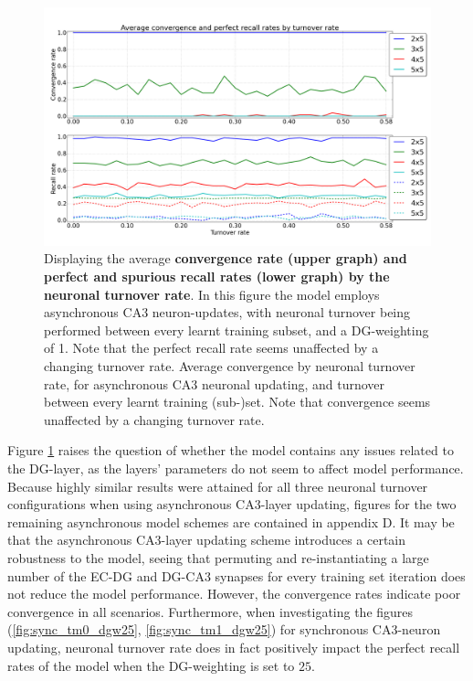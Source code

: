 \begin{figure}
    \centering
    \includegraphics[width=13cm]{fig/turnover_rates/async_tm0_dgw1}
    \caption{Displaying the average \textbf{convergence rate (upper graph) and perfect and spurious recall rates (lower graph) by the neuronal turnover rate}. In this figure the model employs asynchronous CA3 neuron-updates, with neuronal turnover being performed between every learnt training subset, and a DG-weighting of 1. Note that the perfect recall rate seems unaffected by a changing turnover rate.
    Average convergence by neuronal turnover rate, for asynchronous CA3 neuronal updating, and turnover between every learnt training (sub-)set. Note that convergence seems unaffected by a changing turnover rate.}
    \label{fig:async_tm0_dgw1}
\end{figure}

Figure \ref{fig:async_tm0_dgw1} raises the question of whether the model contains any issues related to the DG-layer, as the layers' parameters do not seem to affect model performance. Because highly similar results were attained for all three neuronal turnover configurations when using asynchronous CA3-layer updating, figures for the two remaining asynchronous model schemes are contained in appendix D.
It may be that the asynchronous CA3-layer updating scheme introduces a certain robustness to the model, seeing that permuting and re-instantiating a large number of the EC-DG and DG-CA3 synapses for every training set iteration does not reduce the model performance.
However, the convergence rates indicate poor convergence in all scenarios. Furthermore, when investigating the figures (\ref{fig:sync_tm0_dgw25}, \ref{fig:sync_tm1_dgw25}) for synchronous CA3-neuron updating, neuronal turnover rate does in fact positively impact the perfect recall rates of the model when the DG-weighting is set to $25$.

